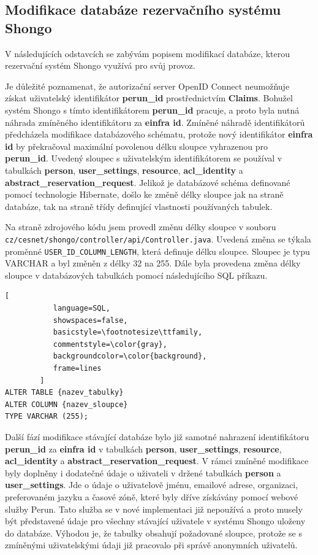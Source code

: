 \documentclass[
  printed, %
  twoside, %
  table,   %
  nolof,     %
  nolot,     %
]{fithesis3}
\begin{document}
\subsection{Modifikace databáze rezervačního systému Shongo}
V následujících odstavcích se zabývám popisem modifikací databáze, kterou rezervační systém Shongo využívá pro svůj provoz.
\par

Je důležité poznamenat, že autorizační server OpenID Connect neumožňuje získat uživatelský identifikátor \textbf{perun\_id} prostřednictvím \textbf{Claims}. Bohužel systém Shongo s tímto identifikátorem \textbf{perun\_id} pracuje, a proto byla nutná náhrada zmíněného identifikátoru za \textbf{einfra id}. Zmíněné náhradě identifikátorů předcházela modifikace databázového schématu, protože nový identifikátor \textbf{einfra id} by překračoval maximální povolenou délku sloupce vyhrazenou pro \textbf{perun\_id}. Uvedený sloupec s uživatelským identifikátorem se používal v tabulkách \textbf{person}, \textbf{user\_settings}, \textbf{resource}, \textbf{acl\_identity} a \textbf{abstract\_reservation\_request}. Jelikož je databázové schéma definované pomocí technologie Hibernate, došlo ke změně délky sloupce jak na straně databáze, tak na straně třídy definující vlastnosti používaných tabulek. 
\par  
Na straně zdrojového kódu jsem provedl změnu délky sloupce v souboru \texttt{cz/cesnet/shongo/controller/api/Controller.java}. Uvedená změna se týkala proměnné \texttt{USER\_ID\_COLUMN\_LENGTH}, která definuje délku sloupce. Sloupec je typu VARCHAR a byl změněn z délky 32 na 255. Dále byla provedena změna délky sloupce v databázových tabulkách pomocí následujícího SQL příkazu.

\begin{lstlisting}[
           language=SQL,
           showspaces=false,
           basicstyle=\footnotesize\ttfamily,
           commentstyle=\color{gray},
           backgroundcolor=\color{background},
           frame=lines
        ]
ALTER TABLE {nazev_tabulky}  
ALTER COLUMN {nazev_sloupce}
TYPE VARCHAR (255);
\end{lstlisting}

Další fází modifikace stávající databáze bylo již samotné nahrazení identifikátoru \textbf{perun\_id} za \textbf{einfra id} v tabulkách \textbf{person}, \textbf{user\_settings}, \textbf{resource}, \textbf{acl\_identity} a \textbf{abstract\_reservation\_request}. V rámci zmíněné modifikace byly doplněny i dodatečné údaje o uživateli v držené tabulkách \textbf{person} a \textbf{user\_settings}. Jde o údaje o uživatelově jménu, emailové adrese, organizaci, preferovaném jazyku a časové zóně, které byly dříve získávány pomocí webové služby Perun. Tato služba se v nové implementaci již nepoužívá a proto musely být představené údaje pro všechny stávající uživatele v systému Shongo uloženy do databáze. Výhodou je, že tabulky obsahují požadované sloupce, protože se s zmíněnými uživatelskými údaji již pracovalo při správě anonymních uživatelů. 
\par
\end{document}
